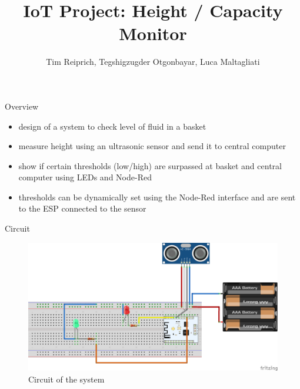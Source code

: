 \documentclass[11pt]{beamer}
\author{Tim Reiprich, Tegshigzugder Otgonbayar, Luca Maltagliati}
\title{IoT Project: Height / Capacity Monitor}
\begin{document}
\begin{frame}
\titlepage
\end{frame}



\begin{frame}{Overview}
\begin{itemize}
\item design of a system to check level of fluid in a basket
\item measure height using an ultrasonic sensor and send it to central computer
\item show if certain thresholds (low/high) are surpassed at basket and central computer using LEDs and Node-Red
\item thresholds can be dynamically set using the Node-Red interface and are sent to the ESP connected to the sensor
\end{itemize}
\end{frame}

\begin{frame}{Circuit}
\begin{figure}
\hspace*{-0.5cm}\includegraphics[scale=0.5]{pic/schema_bb.png}
\caption{Circuit of the system}
\label{schema_bb}
\end{figure}
\end{frame}
\end{document}
